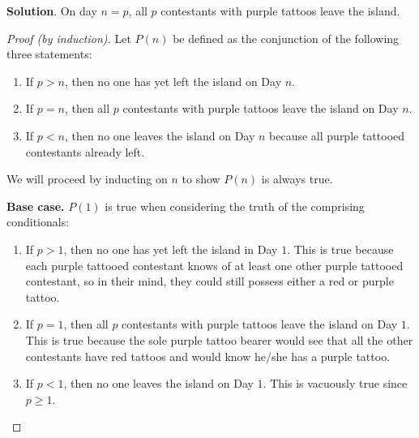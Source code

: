 \documentclass[a4paper]{article}
\newcommand{\CheckedBox}{\mbox{\ooalign{$\checkmark$\cr\hidewidth$\square$\hidewidth\cr}}\hspace{5pt}}
\begin{document}
\bigskip

\textbf{Solution}. On day $n = p$, all $p$ contestants with purple tattoos leave the island.

\begin{proof}[Proof (by induction)]

	Let $P(n)$ be defined as the conjunction of the following three statements:

	\begin{enumerate}
		\item \label{cond:1} If $p > n$, then no one has yet left the island on Day  $n$.
		\item \label{cond:2} If $p = n$, then all $p$ contestants with purple tattoos leave the island on Day $n$.
		\item \label{cond:3} If $p < n$, then no one leaves the island on Day $n$ because all purple tattooed contestants already left.
	\end{enumerate}

	We will proceed by inducting on $n$ to show $P(n)$ is always true.

	\textbf{Base case.} $P(1)$ is true when considering the truth of the
	comprising conditionals:
	\begin{enumerate}
		\item \CheckedBox If $p > 1$, then no one has yet left the island in Day $1$. This is true because each
			purple tattooed contestant knows of at least one other purple tattooed
			contestant, so in their mind, they could still possess either a red or
			purple tattoo.
		\item \CheckedBox If $p = 1$, then all $p$ contestants with purple tattoos
			leave the island on Day $1$. This is true because the sole purple tattoo bearer
			would see that all the other contestants have red tattoos and would know
			he/she has a purple tattoo.
		\item \CheckedBox If $p < 1$, then no one leaves the island on Day $1$. This is vacuously true since $p \geq 1$.
\end{enumerate}


\end{proof}
\end{document}
